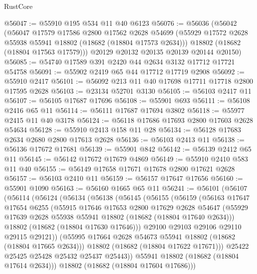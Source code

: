 \begin{lexlean}{RustCore}
\begin{coremodule}
@56047 := @55910 @195 @534 @11 @40 @6123
@56076 := @56036
    (@56042
      (@56047
        @17579
        @17586
        @2800
        @17562
        @2628
        @54699
        (@55929 @17572 @2628 @55938 @55941 @18802 (@18682 (@18804 @17573 @2634)))
        @18802
        (@18682 (@18804 @17563 @17579)))
      @20129
      @20132
      @20135
      @20139
      @20144
      @20150)
@56085 := @54740 @17589 @391 @2420 @44 @2634 @3132 @17712 @17721 @54758
@56091 := @55902 @2419 @65 @44 @17712 @17719 @2908
@56092 := @55910 @2417
@56101 := @56092 @213 @11 @40 @17698 @17711 @17718 @2800 @17595 @2628
@56103 := @23134 @52701 @3130
@56105 := @56103 @2417 @11
@56107 := @56105 @17687 @17696
@56108 := @55901 @693
@56111 := @56108 @2416 @65 @11
@56114 := @56111 @17687 @17694 @3802
@56118 := @55977 @2415 @11 @40 @3178
@56124 := @56118 @17686 @17693 @2800 @17603 @2628 @54634
@56128 := @55910 @2413 @158 @11 @28
@56134 := @56128 @17683 @2634 @2680 @2800 @17613 @2628
@56136 := @56103 @2413 @11
@56138 := @56136 @17672 @17681
@56139 := @55901 @842
@56142 := @56139 @2412 @65 @11
@56145 := @56142 @17672 @17679 @4869
@56149 := @55910 @2410 @583 @11 @40
@56155 := @56149 @17658 @17671 @17678 @2800 @17621 @2628
@56157 := @56103 @2410 @11
@56159 := @56157 @17647 @17656
@56160 := @55901 @1090
@56163 := @56160 @1665 @65 @11
@56241 := @56101
    (@56107
      (@56114
        (@56124
          (@56134
            (@56138
              (@56145
                (@56155
                  (@56159
                    (@56163
                      @17647
                      @17654
                      @6255
                      (@55915
                        @17646
                        @17653
                        @2800
                        @17629
                        @2628
                        @54647
                        (@55929 @17639 @2628 @55938 @55941 @18802 (@18682 (@18804 @17640 @2634)))
                        @18802
                        (@18682 (@18804 @17630 @17646)))
                      @29100
                      @29103
                      @29106
                      @29110
                      @29115
                      @29121))
                  (@55995 @17664 @2628 @54673 @55941 @18802 (@18682 (@18804 @17665 @2634)))
                  @18802
                  (@18682 (@18804 @17622 @17671)))
                @25422
                @25425
                @25428
                @25432
                @25437
                @25443))
            @55941
            @18802
            (@18682 (@18804 @17614 @2634)))
          @18802
          (@18682 (@18804 @17604 @17686)))

\end{coremodule}
\end{lexlean}
